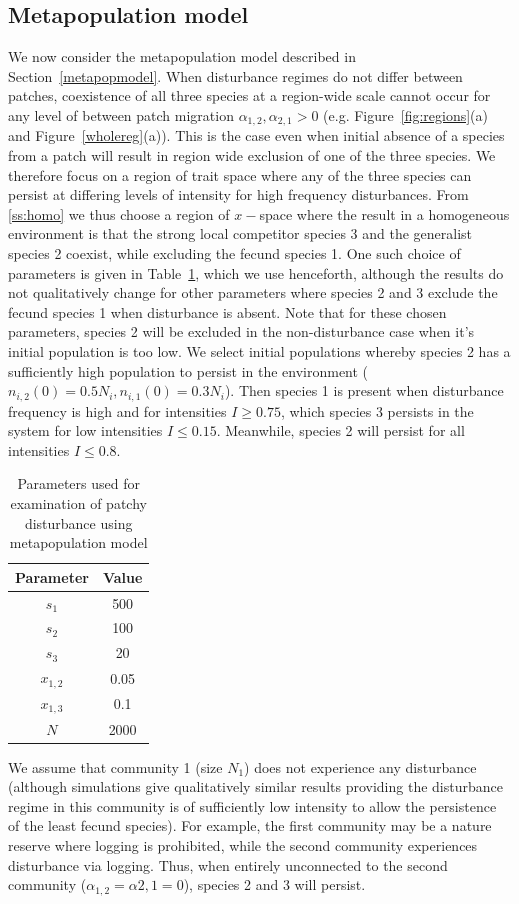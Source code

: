\subsection{Metapopulation model}
We now consider the metapopulation model described in Section~\ref{metapopmodel}. When disturbance regimes do not differ between patches, coexistence of all three species at a region-wide scale cannot occur for any level of between patch migration $\alpha_{1,2},\alpha_{2,1}>0$ (e.g. Figure~\ref{fig:regions}(a) and Figure~\ref{wholereg}(a)). This is the case even when initial absence of a species from a patch will result in region wide exclusion of one of the three species. We therefore focus on a region of trait space where any of the three species can persist at differing levels of intensity for high frequency disturbances. From \ref{ss:homo} we thus choose a region of $x-$space where the result in a homogeneous environment is that the strong local competitor species 3 and the generalist species 2 coexist, while excluding the fecund species 1. One such choice of parameters is given in Table~\ref{tab:paras}, which we use henceforth, although the results do not qualitatively change for other parameters where species 2 and 3 exclude the fecund species 1 when disturbance is absent. Note that for these chosen parameters, species 2 will be excluded in the non-disturbance case when it's initial population is too low. We select initial populations whereby species 2 has a sufficiently high population to persist in the environment ($n_{i,2}(0)=0.5N_i,n_{i,1}(0)=0.3N_i$). Then species 1 is present when disturbance frequency is high and for intensities $I\geq0.75$, which species 3 persists in the system for low intensities $I\leq 0.15$. Meanwhile, species 2 will persist for all intensities $I\leq 0.8$.
\begin{table}[htdp]
\begin{center}
\begin{tabular}{|c|c|} \hline
Parameter & Value\\ \hline
$s_1$&500\\
$s_2$&100\\
$s_3$&20\\
$x_{1,2}$&0.05\\
$x_{1,3}$&0.1\\
$N$&2000\\ \hline
\end{tabular}
\end{center}
\caption[Parameters used for examination of patchy disturbance]{Parameters used for examination of patchy disturbance using metapopulation model}
\label{tab:paras}
\end{table}
We assume that community 1 (size $N_1$) does not experience any disturbance (although simulations give qualitatively similar results providing the disturbance regime in this community is of sufficiently low intensity to allow the persistence of the least fecund species). For example, the first community may be a nature reserve where logging is prohibited, while the second community experiences disturbance via logging. Thus, when entirely unconnected to the second community ($\alpha_{1,2}=\alpha{2,1}=0$), species 2 and 3 will persist.

